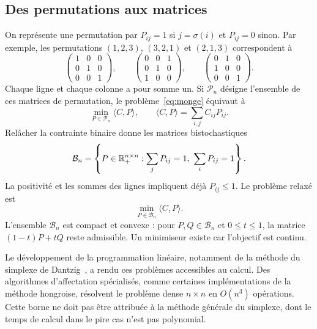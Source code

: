 \subsection{Des permutations aux matrices}
On représente une permutation par $P_{ij}=1$ si $j=\sigma(i)$ et $P_{ij}=0$ sinon. Par exemple, les permutations $(1,2,3)$, $(3,2,1)$ et $(2,1,3)$ correspondent à
\[
 \begin{pmatrix}1&0&0\\0&1&0\\0&0&1\end{pmatrix},\qquad
 \begin{pmatrix}0&0&1\\0&1&0\\1&0&0\end{pmatrix},\qquad
 \begin{pmatrix}0&1&0\\1&0&0\\0&0&1\end{pmatrix}.
\]
Chaque ligne et chaque colonne a pour somme un. Si $\mathcal P_n$ désigne l'ensemble de ces matrices de permutation, le problème~\eqref{eq:monge} équivaut à
\begin{equation}\label{eq:mongematrix}
 \min_{P\in\mathcal P_n}\langle C,P\rangle,
 \qquad \langle C,P\rangle=\sum_{i,j}C_{ij}P_{ij}.
\end{equation}
Relâcher la contrainte binaire donne les matrices bistochastiques
\begin{equation}\label{eq:bistoch}
 \mathcal B_n=\left\{P\in\RR_+^{n\times n}:\sum_jP_{ij}=1,\ \sum_iP_{ij}=1\right\}.
\end{equation}
La positivité et les sommes des lignes impliquent déjà $P_{ij}\le1$. Le problème relaxé est
\begin{equation}\label{eq:kantoassign}
 \min_{P\in\mathcal B_n}\langle C,P\rangle.
\end{equation}
L'ensemble $\mathcal B_n$ est compact et convexe : pour $P,Q\in\mathcal B_n$ et $0\le t\le1$, la matrice $(1-t)P+tQ$ reste admissible. Un minimiseur existe car l'objectif est continu.

Le développement de la programmation linéaire, notamment de la méthode du simplexe de Dantzig~\cite{Dantzig51}, a rendu ces problèmes accessibles au calcul. Des algorithmes d'affectation spécialisés, comme certaines implémentations de la méthode hongroise, résolvent le problème dense $n\times n$ en $O(n^3)$ opérations. Cette borne ne doit pas être attribuée à la méthode générale du simplexe, dont le temps de calcul dans le pire cas n'est pas polynomial.

